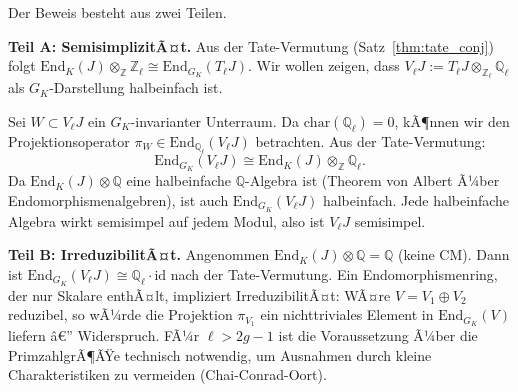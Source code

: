 ﻿\documentclass[12pt,a4paper]{article}
\theoremstyle{plain}
\theoremstyle{definition}
\theoremstyle{remark}
\newenvironment{proof*}[1][Beweis]{%
  \begin{proof}[#1]\renewcommand{\qedsymbol}{$\blacksquare$}}
  {\end{proof}}
\newcommand{\Q}{\mathbb{Q}}
\newcommand{\Z}{\mathbb{Z}}
\newcommand{\End}{\mathrm{End}}
\begin{document}
\begin{proof*}
Der Beweis besteht aus zwei Teilen.

\textbf{Teil A: SemisimplizitÃ¤t.}
Aus der Tate-Vermutung (Satz~\ref{thm:tate_conj}) folgt
$\End_K(J) \otimes_\Z \Z_\ell \cong \End_{G_K}(T_\ell J)$.
Wir wollen zeigen, dass $V_\ell J := T_\ell J \otimes_{\Z_\ell} \Q_\ell$
als $G_K$-Darstellung halbeinfach ist.

Sei $W \subset V_\ell J$ ein $G_K$-invarianter Unterraum.
Da $\mathrm{char}(\Q_\ell) = 0$, kÃ¶nnen wir den Projektionsoperator
$\pi_W \in \End_{\Q_\ell}(V_\ell J)$ betrachten. Aus der Tate-Vermutung:
\[
  \End_{G_K}(V_\ell J) \cong \End_K(J) \otimes_\Z \Q_\ell.
\]
Da $\End_K(J) \otimes \Q$ eine halbeinfache $\Q$-Algebra ist
(Theorem von Albert Ã¼ber Endomorphismenalgebren), ist auch
$\End_{G_K}(V_\ell J)$ halbeinfach. Jede halbeinfache Algebra wirkt
semisimpel auf jedem Modul, also ist $V_\ell J$ semisimpel.

\textbf{Teil B: IrreduzibilitÃ¤t.}
Angenommen $\End_K(J)\otimes\Q = \Q$ (keine CM). Dann ist
$\End_{G_K}(V_\ell J) \cong \Q_\ell \cdot \mathrm{id}$ nach der Tate-Vermutung.
Ein Endomorphismenring, der nur Skalare enthÃ¤lt, impliziert IrreduzibilitÃ¤t:
WÃ¤re $V = V_1 \oplus V_2$ reduzibel, so wÃ¼rde die Projektion $\pi_{V_1}$
ein nichttriviales Element in $\End_{G_K}(V)$ liefern â€” Widerspruch.
FÃ¼r $\ell > 2g-1$ ist die Voraussetzung Ã¼ber die PrimzahlgrÃ¶ÃŸe technisch notwendig,
um Ausnahmen durch kleine Charakteristiken zu vermeiden (Chai-Conrad-Oort).
\end{proof*}
\end{document}
